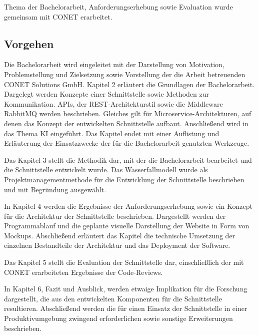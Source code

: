 Thema der Bachelorarbeit, Anforderungserhebung sowie Evaluation wurde gemeinsam mit CONET erarbeitet. 

\subsection{Vorgehen}
Die Bachelorarbeit wird eingeleitet mit der Darstellung von Motivation, Problemstellung und Zielsetzung sowie Vorstellung der die Arbeit betreuenden CONET Solutions GmbH. Kapitel 2 erläutert die Grundlagen der Bachelorarbeit.  Dargelegt werden Konzepte einer Schnittstelle sowie Methoden zur Kommunikation. APIs, der REST-Architekturstil sowie die Middleware RabbitMQ werden beschrieben. Gleiches gilt für Microservice-Architekturen, auf denen das Konzept der entwickelten Schnittstelle aufbaut. Anschließend wird in das Thema KI eingeführt. Das Kapitel endet mit einer Auflistung und Erläuterung der Einsatzzwecke der für die Bachelorarbeit genutzten Werkzeuge.

Das Kapitel 3 stellt die Methodik dar, mit der die Bachelorarbeit bearbeitet und die Schnittstelle entwickelt wurde. Das Wasserfallmodell wurde als Projektmanagementmethode für die Entwicklung der Schnittstelle beschrieben und mit Begründung ausgewählt.

In Kapitel 4 werden die Ergebnisse der Anforderungserhebung sowie ein Konzept für die Architektur der Schnittstelle beschrieben. Dargestellt werden der Programmablauf und die geplante visuelle Darstellung der Website in Form von Mockups. Abschließend erläutert das Kapitel die technische Umsetzung der einzelnen Bestandteile der Architektur und das Deployment der Software.

Das Kapitel 5 stellt die Evaluation der Schnittstelle dar, einschließlich der mit CONET erarbeiteten Ergebnisse der Code-Reviews.

In Kapitel 6, Fazit und Ausblick, werden etwaige Implikation für die Forschung dargestellt, die aus den entwickelten Komponenten für die Schnittstelle resultieren. Abschließend werden die für einen Einsatz der Schnittstelle in einer Produktivumgebung zwingend erforderlichen sowie sonstige Erweiterungen beschrieben.



